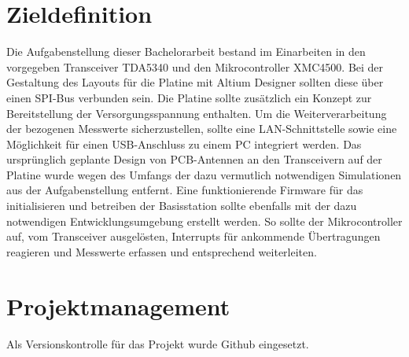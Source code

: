 \section{Zieldefinition}
Die Aufgabenstellung dieser Bachelorarbeit bestand im Einarbeiten in den vorgegeben Transceiver TDA5340 und den Mikrocontroller XMC4500. Bei der Gestaltung des Layouts für die Platine mit Altium Designer sollten diese über einen SPI-Bus verbunden sein. Die Platine sollte zusätzlich ein Konzept zur Bereitstellung der Versorgungsspannung enthalten. Um die Weiterverarbeitung der bezogenen Messwerte sicherzustellen, sollte eine LAN-Schnittstelle sowie eine Möglichkeit für einen USB-Anschluss zu einem PC integriert werden.
Das ursprünglich geplante Design von PCB-Antennen an den Transceivern auf der Platine wurde wegen des Umfangs der dazu vermutlich notwendigen Simulationen aus der Aufgabenstellung entfernt.
Eine funktionierende Firmware für das initialisieren und betreiben der Basisstation sollte ebenfalls mit der dazu notwendigen Entwicklungsumgebung erstellt werden. So sollte der Mikrocontroller auf, vom Transceiver ausgelösten, Interrupts für ankommende Übertragungen reagieren und Messwerte erfassen und entsprechend weiterleiten.


\section{Projektmanagement}
Als Versionskontrolle für das Projekt wurde Github eingesetzt.
